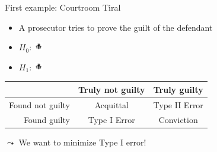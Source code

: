\begin{frame}[c]{First example: Courtroom Tiral}

\begin{itemize}
\item A prosecutor tries to prove the guilt of the defendant
\item $H_0$: \includegraphics[height=1em]{images/hands} 
\item $H_1$: \includegraphics[height=1em]{images/hands} 
\pause
\end{itemize}

\medskip
\pause
\bigskip
\centering
\begin{tabular}{r|cc}
\toprule
& Truly not guilty 	& Truly guilty\\
\hline
Found not guilty 	& Acquittal & Type II Error\\
Found guilty & Type I Error		& Conviction\\
\bottomrule
\end{tabular}	

\bigskip
$\leadsto$ We want to minimize Type I error!

\end{frame}
